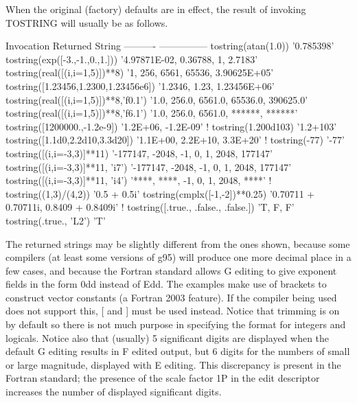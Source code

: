 When the original (factory) defaults are in effect, the result of invoking T\+O\+S\+T\+R\+I\+NG will usually be as follows. \begin{DoxyVerb}  Invocation                             Returned String
  ----------                             ---------------
  tostring(atan(1.0))                    '0.785398'
  tostring(exp([-3.,-1.,0.,1.]))         '4.97871E-02, 0.36788, 1, 2.7183'
  tostring(real([(i,i=1,5)])**8)         '1, 256, 6561, 65536, 3.90625E+05'
  tostring([1.23456,1.2300,1.23456e6])   '1.2346, 1.23, 1.23456E+06'
  tostring(real([(i,i=1,5)])**8,'f0.1')  '1.0, 256.0, 6561.0, 65536.0, 390625.0'
  tostring(real([(i,i=1,5)])**8,'f6.1')  '1.0, 256.0, 6561.0, ******, ******'
  tostring([1200000.,-1.2e-9])           '1.2E+06, -1.2E-09'
  !
  tostring(1.200d103)                    '1.2+103'
  tostring([1.1d0,2.2d10,3.3d20])        '1.1E+00, 2.2E+10, 3.3E+20'
  !
  tostring(-77)                          '-77'
  tostring([(i,i=-3,3)]**11)             '-177147, -2048, -1, 0, 1, 2048, 177147'
  tostring([(i,i=-3,3)]**11, 'i7')       '-177147, -2048, -1, 0, 1, 2048, 177147'
  tostring([(i,i=-3,3)]**11, 'i4')       '****, ****, -1, 0, 1, 2048, ****'
  !
  tostring((1,3)/(4,2))                  '0.5 + 0.5i'
  tostring(cmplx([-1,-2])**0.25)       '0.70711 + 0.70711i, 0.8409 + 0.8409i'
  !
  tostring([.true., .false., .false.])   'T, F, F'
  tostring(.true., 'L2')                 'T'
\end{DoxyVerb}


The returned strings may be slightly different from the ones shown, because some compilers (at least some versions of g95) will produce one more decimal place in a few cases, and because the Fortran standard allows G editing to give exponent fields in the form 0dd instead of Edd. The examples make use of brackets to construct vector constants (a Fortran 2003 feature). If the compiler being used does not support this, \mbox{[} and \mbox{]} must be used instead. Notice that trimming is on by default so there is not much purpose in specifying the format for integers and logicals. Notice also that (usually) 5 significant digits are displayed when the default G editing results in F edited output, but 6 digits for the numbers of small or large magnitude, displayed with E editing. This discrepancy is present in the Fortran standard; the presence of the scale factor 1P in the edit descriptor increases the number of displayed significant digits.

